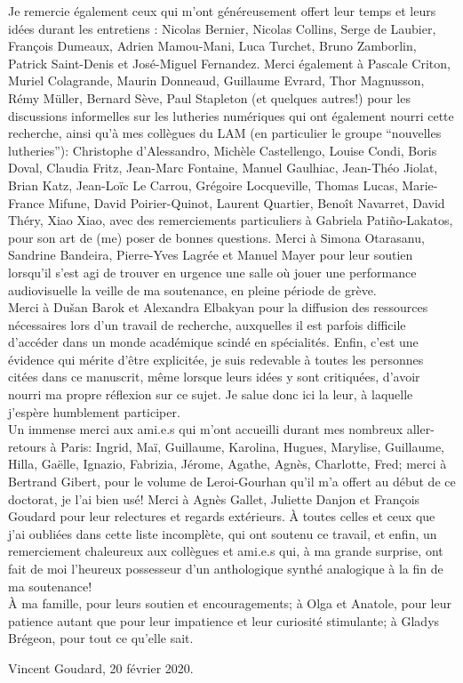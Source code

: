 \indent Je remercie également ceux qui m'ont généreusement offert leur temps et leurs idées durant les entretiens : Nicolas Bernier, Nicolas Collins, Serge de Laubier, François Dumeaux, Adrien Mamou-Mani, Luca Turchet, Bruno Zamborlin, Patrick Saint-Denis et José-Miguel Fernandez. Merci également à Pascale Criton, Muriel Colagrande, Maurin Donneaud, Guillaume Evrard, Thor Magnusson, Rémy Müller, Bernard Sève, Paul Stapleton (et quelques autres!) pour les discussions informelles sur les lutheries numériques qui ont également nourri cette recherche, ainsi qu'à mes collègues du LAM (en particulier le groupe ``nouvelles lutheries''): Christophe d'Alessandro, Michèle Castellengo, Louise Condi, Boris Doval, Claudia Fritz, Jean-Marc Fontaine, Manuel Gaulhiac, Jean-Théo Jiolat, Brian Katz, Jean-Loïc Le Carrou, Grégoire Locqueville, Thomas Lucas, Marie-France Mifune, David Poirier-Quinot, Laurent Quartier, Benoît Navarret, David Théry, Xiao Xiao, avec des remerciements particuliers à Gabriela Patiño-Lakatos, pour son art de (me) poser de bonnes questions. Merci à Simona Otarasanu, Sandrine Bandeira, Pierre-Yves Lagrée et Manuel Mayer pour leur soutien lorsqu'il s'est agi de trouver en urgence une salle où jouer une performance audiovisuelle la veille de ma soutenance, en pleine période de grève.\\
\indent Merci à Dušan Barok et Alexandra Elbakyan pour la diffusion des ressources nécessaires lors d'un travail de recherche, auxquelles il est parfois difficile d'accéder dans un monde académique scindé en spécialités. Enfin, c'est une évidence qui mérite d'être explicitée, je suis redevable à toutes les personnes citées dans ce manuscrit, même lorsque leurs idées y sont critiquées, d'avoir nourri ma propre réflexion sur ce sujet. Je salue donc ici la leur, à laquelle j'espère humblement participer.\\
\indent Un immense merci aux ami.e.s qui m'ont accueilli durant mes nombreux aller-retours à Paris: Ingrid, Maï, Guillaume, Karolina, Hugues, Marylise, Guillaume, Hilla, Gaëlle, Ignazio, Fabrizia, Jérome, Agathe, Agnès, Charlotte, Fred; merci à Bertrand Gibert, pour le volume de Leroi-Gourhan qu'il m'a offert au début de ce doctorat, je l'ai bien usé! Merci à Agnès Gallet, Juliette Danjon et François Goudard pour leur relectures et regards extérieurs. À toutes celles et ceux que j'ai oubliées dans cette liste incomplète, qui ont soutenu ce travail, et enfin, un remerciement chaleureux aux collègues et ami.e.s qui, à ma grande surprise, ont fait de moi l'heureux possesseur d'un anthologique synthé analogique à la fin de ma soutenance!\\
\indent À ma famille, pour leurs soutien et encouragements; à Olga et Anatole, pour leur patience autant que pour leur impatience et leur curiosité stimulante; à Gladys Brégeon, pour tout ce qu'elle sait.
\begin{flushright}
Vincent Goudard, 20 février 2020.
\end{flushright}